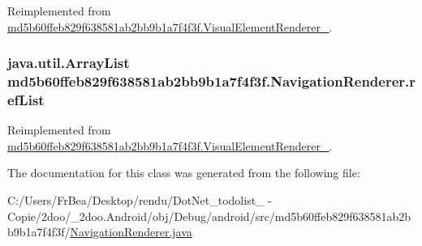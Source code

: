 Reimplemented from \hyperlink{classmd5b60ffeb829f638581ab2bb9b1a7f4f3f_1_1_visual_element_renderer__1_4ef182bc984a4330ed789e1f0b0222d1}{md5b60ffeb829f638581ab2bb9b1a7f4f3f.VisualElementRenderer\_}.\hypertarget{classmd5b60ffeb829f638581ab2bb9b1a7f4f3f_1_1_navigation_renderer_34e14358e96ac8045a51c49c123a8e3e}{
\subsubsection[{refList}]{\setlength{\rightskip}{0pt plus 5cm}java.util.ArrayList {\bf md5b60ffeb829f638581ab2bb9b1a7f4f3f.NavigationRenderer.refList}}}
\label{classmd5b60ffeb829f638581ab2bb9b1a7f4f3f_1_1_navigation_renderer_34e14358e96ac8045a51c49c123a8e3e}




Reimplemented from \hyperlink{classmd5b60ffeb829f638581ab2bb9b1a7f4f3f_1_1_visual_element_renderer__1_4ebd0e42ebd360712eb189930036fc9f}{md5b60ffeb829f638581ab2bb9b1a7f4f3f.VisualElementRenderer\_}.

The documentation for this class was generated from the following file:\begin{CompactItemize}
\item 
C:/Users/FrBea/Desktop/rendu/DotNet\_\-todolist\_ - Copie/2doo/\_\-2doo.Android/obj/Debug/android/src/md5b60ffeb829f638581ab2bb9b1a7f4f3f/\hyperlink{_navigation_renderer_8java}{NavigationRenderer.java}\end{CompactItemize}
